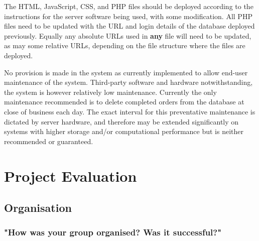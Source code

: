 \documentclass[11pt, oneside, a4paper]{report}   %
\begin{document}
The HTML, JavaScript, CSS, and PHP files should be deployed according to the instructions for the server software being used, with some modification. All PHP files need to be updated with the URL and login details of the database deployed previously. Equally any absolute URLs used in \textbf{any} file will need to be updated, as may some relative URLs, depending on the file structure where the files are deployed.

No provision is made in the system as currently implemented to allow end-user maintenance of the system. Third-party software and hardware notwithstanding, the system is however relatively low maintenance. Currently the only maintenance recommended is to delete completed orders from the database at close of business each day. The exact interval for this preventative maintenance is dictated by server hardware, and therefore may be extended significantly on systems with higher storage and/or computational performance but is neither recommended or guaranteed. 

\dominitoc %
\chapter{Project Evaluation} 
\pagebreak
\minitoc
\pagebreak
\section{Organisation} \label{sec:Organisation}
\subsection{"How was your group organised? Was it successful?"} \label{sec:Organisation - 1}
\end{document}
